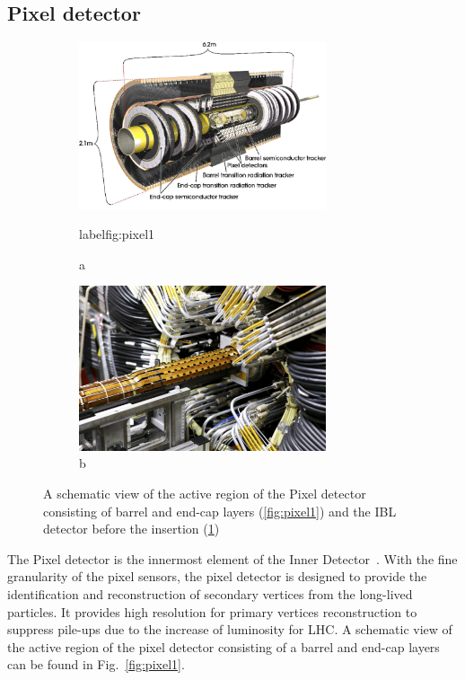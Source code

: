 \subsection{Pixel detector}
\label{sec:pixel}

\begin{figure}[htbp!]
\begin{subfigure}{.5\textwidth}
    \centering
    \includegraphics[width=0.8\textwidth]{chapters/c4/figures/pixel}
    \caption{a}
    label{fig:pixel1}
\end{subfigure}%
\begin{subfigure}{.5\textwidth}
    \centering
    \includegraphics[width=0.8\textwidth]{chapters/c4/figures/IBL}
    \caption{b}
    \label{fig:pixel2}
\end{subfigure}
\caption{A schematic view of the active region of the Pixel detector consisting of barrel and end-cap layers (\ref{fig:pixel1}) and the IBL detector before the insertion (\ref{fig:pixel2})}
\label{fig:pixel}
\end{figure}

\par The Pixel detector is the innermost element of the Inner Detector~\cite{Hirono:2641635}. With the fine granularity of the pixel sensors, the pixel detector is designed to provide the identification and reconstruction of secondary vertices from the long-lived particles. It provides high resolution for primary vertices reconstruction to suppress pile-ups due to the increase of luminosity for LHC. A schematic view of the active region of the pixel detector consisting of a barrel and end-cap layers can be found in Fig.~\ref{fig:pixel1}.

